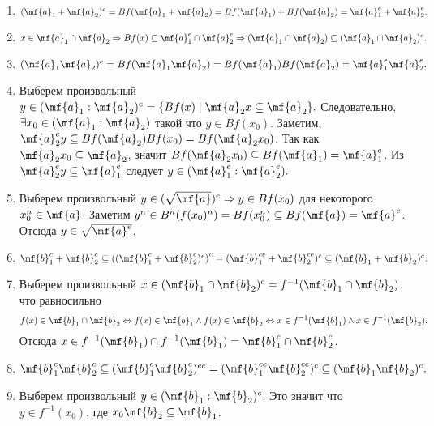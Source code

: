     \begin{Proof}
        \begin{enumerate}
            \item $(\mf{a}_1 + \mf{a}_2)^e = Bf(\mf{a}_1 + \mf{a}_2) = Bf(\mf{a}_1) + Bf(\mf{a}_2) = \mf{a}_1^e + \mf{a}_2^e.$
            \item $x \in \mf{a}_1 \cap \mf{a}_2 \Rightarrow Bf(x) \subseteq \mf{a}_1^e \cap \mf{a}_2^e \Rightarrow (\mf{a}_1 \cap \mf{a}_2) \subseteq (\mf{a}_1 \cap \mf{a}_2)^e.$
            \item $(\mf{a}_1\mf{a}_2)^e = Bf(\mf{a}_1\mf{a}_2) = Bf(\mf{a}_1)Bf(\mf{a}_2) = \mf{a}_1^e\mf{a}_2^e.$
            \item Выберем произвольный $y \in (\mf{a}_1 : \mf{a}_2)^e = \{Bf(x) \mid \mf{a}_2x \subseteq \mf{a}_2 \}.$ \newline
                Следовательно, $\exists x_0 \in (\mf{a}_1 : \mf{a}_2)$ такой что $y \in Bf(x_0).$ 
                Заметим, $\mf{a}_2^ey \subseteq Bf(\mf{a}_2)Bf(x_0) = Bf(\mf{a}_2x_0)$. \newline
                Так как $\mf{a}_2x_0 \subseteq \mf{a}_2$, значит $Bf(\mf{a}_2x_0) \subseteq Bf(\mf{a}_1) = \mf{a}_1^e$. 
                Из $\mf{a}_2^ey \subseteq \mf{a}_1^e$ следует $y \in (\mf{a}_1^e : \mf{a}_2^e).$
            \item Выберем произвольный $y \in (\sqrt{\mf{a}})^e \Rightarrow y \in Bf(x_0)$ для некоторого $x_0^n \in \mf{a}$.
                Заметим $y^n \in B^n(f(x_0)^n) = Bf(x_0^n) \subseteq Bf(\mf{a}) = \mf{a}^e$. Отсюда $y \in \sqrt{\mf{a}^e}$.
            \item $\mf{b}_1^c + \mf{b}_2^c \subseteq (\left(\mf{b}_1^c + \mf{b}_2^c)^e\right)^c = (\mf{b}_1^{ce} + \mf{b}_2^{ce})^c \subseteq (\mf{b}_1 + \mf{b}_2)^c.$
            \item Выберем произвольный $x \in (\mf{b}_1 \cap \mf{b}_2)^c = f^{-1}(\mf{b}_1 \cap \mf{b}_2)$, что равносильно
                $$
                    f(x) \in \mf{b}_1 \cap \mf{b}_2 \Leftrightarrow f(x) \in \mf{b}_1 \wedge f(x) \in \mf{b}_2 \Leftrightarrow x \in f^{-1}(\mf{b}_1) \wedge x \in f^{-1}(\mf{b}_2).
                $$
                Отсюда $x \in f^{-1}(\mf{b}_1) \cap f^{-1}(\mf{b}_1) = \mf{b}_1^c \cap \mf{b}_2^c$.
            \item $\mf{b}_1^c\mf{b}_2^c \subseteq (\mf{b}_1^c\mf{b}_2^c)^{ec} = (\mf{b}_1^{ce}\mf{b}_2^{ce})^c \subseteq (\mf{b}_1\mf{b}_2)^c.$
            \item Выберем произвольный $y \in (\mf{b}_1 : \mf{b}_2)^c$. Это значит что $y \in f^{-1}(x_0)$, где $x_0\mf{b}_2 \subseteq \mf{b}_1$.
            

\end{enumerate}
\end{Proof}
